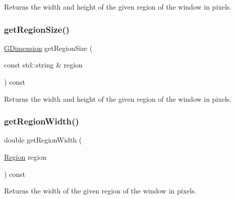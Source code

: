 Returns the width and height of the given region of the window in pixels. 

\mbox{\label{classGWindow_a68b18b38b72cb8779fca0c3882549a6b}} 
\subsubsection{\texorpdfstring{get\+Region\+Size()}{getRegionSize()}\hspace{0.1cm}{\footnotesize\ttfamily [2/2]}}
{\footnotesize\ttfamily \mbox{\hyperlink{classGDimension}{G\+Dimension}} get\+Region\+Size (\begin{DoxyParamCaption}\item[{const std\+::string \&}]{region }\end{DoxyParamCaption}) const\hspace{0.3cm}{\ttfamily [virtual]}}



Returns the width and height of the given region of the window in pixels. 

\mbox{\label{classGWindow_a96e2005c3f447a8679c3c32d3fc02de1}} 
\subsubsection{\texorpdfstring{get\+Region\+Width()}{getRegionWidth()}\hspace{0.1cm}{\footnotesize\ttfamily [1/2]}}
{\footnotesize\ttfamily double get\+Region\+Width (\begin{DoxyParamCaption}\item[{\mbox{\hyperlink{classGWindow_a81a01a86de31071a92e6cce0bab9bc4b}{Region}}}]{region }\end{DoxyParamCaption}) const\hspace{0.3cm}{\ttfamily [virtual]}}



Returns the width of the given region of the window in pixels. 

\mbox{\label{classGWindow_ab169dab454fc90f1c845b91b4e1a8a14}} 
